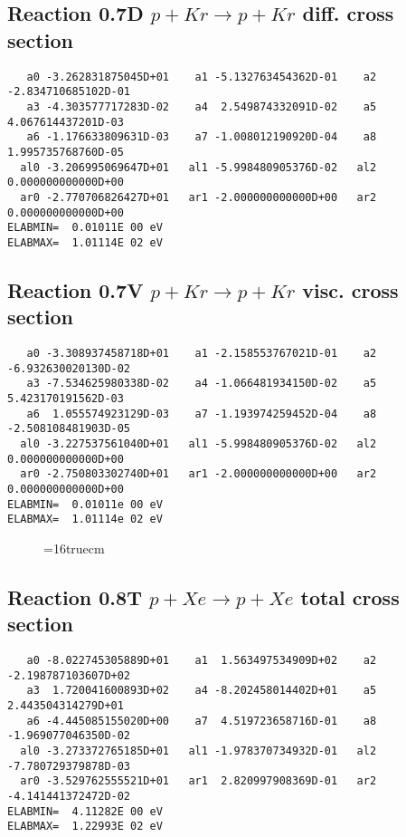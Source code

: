\documentclass[12pt]{article}
\begin{document}
\subsection{
Reaction 0.7D    $p + Kr \rightarrow p + Kr  $ diff. cross
section }


\begin{small}\begin{verbatim}
   a0 -3.262831875045D+01    a1 -5.132763454362D-01    a2 -2.834710685102D-01
   a3 -4.303577717283D-02    a4  2.549874332091D-02    a5  4.067614437201D-03
   a6 -1.176633809631D-03    a7 -1.008012190920D-04    a8  1.995735768760D-05
  al0 -3.206995069647D+01   al1 -5.998480905376D-02   al2  0.000000000000D+00
  ar0 -2.770706826427D+01   ar1 -2.000000000000D+00   ar2  0.000000000000D+00
ELABMIN=  0.01011E 00 eV
ELABMAX=  1.01114E 02 eV
\end{verbatim}\end{small}

\subsection{
Reaction 0.7V   $ p + Kr \rightarrow p + Kr  $ visc. cross
section }


\begin{small}\begin{verbatim}
   a0 -3.308937458718D+01    a1 -2.158553767021D-01    a2 -6.932630020130D-02
   a3 -7.534625980338D-02    a4 -1.066481934150D-02    a5  5.423170191562D-03
   a6  1.055574923129D-03    a7 -1.193974259452D-04    a8 -2.508108481903D-05
  al0 -3.227537561040D+01   al1 -5.998480905376D-02   al2  0.000000000000D+00
  ar0 -2.750803302740D+01   ar1 -2.000000000000D+00   ar2  0.000000000000D+00
ELABMIN=  0.01011e 00 eV
ELABMAX=  1.01114e 02 eV
\end{verbatim}\end{small}


\begin{figure} \label{0.7}
\epsfxsize=16truecm
\end{figure}
\newpage


\subsection{
Reaction 0.8T   $ p + Xe \rightarrow p + Xe $ total cross
section }



\begin{small}\begin{verbatim}
   a0 -8.022745305889D+01    a1  1.563497534909D+02    a2 -2.198787103607D+02
   a3  1.720041600893D+02    a4 -8.202458014402D+01    a5  2.443504314279D+01
   a6 -4.445085155020D+00    a7  4.519723658716D-01    a8 -1.969077046350D-02
  al0 -3.273372765185D+01   al1 -1.978370734932D-01   al2 -7.780729379878D-03
  ar0 -3.529762555521D+01   ar1  2.820997908369D-01   ar2 -4.141441372472D-02
ELABMIN=  4.11282E 00 eV
ELABMAX=  1.22993E 02 eV
\end{verbatim}\end{small}
\end{document}
